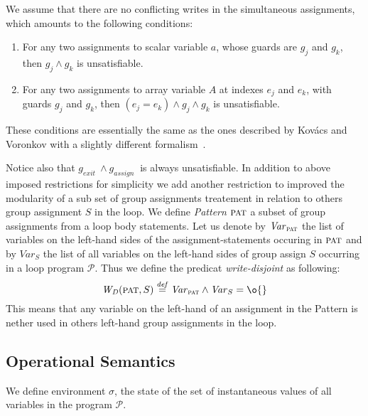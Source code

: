 \documentclass[a4paper,10pt]{article}
\newcommand{\prog}{\ensuremath{\mathcal{P}}\xspace}
\newcommand{\gexit}{\ensuremath{\mathit{g_{exit}~}}}
\newcommand{\gassign}{\ensuremath{\mathit{g_{assign}~}}}
\newcommand{\pat}{\ensuremath{\textsc{pat}}\xspace}
\newcommand{\writedisjoint}[2]{\ensuremath{\mathit{W_D}(#1,#2)}\xspace}
\newcommand{\var}[1]{\ensuremath{\mathit{Var}_{#1}}\xspace}
\newcommand{\symdef}{\ensuremath{\overset{\mathit{def}}{=}}}
\begin{document}
\vspace{0.5cm}

We assume that there are no conflicting writes in the simultaneous assignments,
which amounts to the following conditions:
\begin{enumerate}
\item For any two assignments to scalar variable $a$, whose guards are $g_j$
  and $g_k$, then $g_j \land g_k$ is unsatisfiable.
\item For any two assignments to array variable $A$ at indexes $e_j$ and $e_k$,
  with guards $g_j$ and $g_k$, then $(e_j = e_k) \land g_j \land g_k$ is
  unsatisfiable.
\end{enumerate}

These conditions are essentially the same as the ones described by Kov\'acs and
Voronkov with a slightly different formalism~\cite{kovacs:2009:fli}.

\vspace{0.5cm}

Notice also that $\gexit \land \gassign $ is always unsatisfiable.
In addition to above imposed restrictions for simplicity we add  another restriction
to improved the modularity of a sub set of group assignments treatement in relation 
to others group assignment $S$ in the loop. We define \emph{Pattern} \pat a subset of 
group assignments from a loop body statements.
Let us denote by \var{\pat} the list of variables on the left-hand sides of the 
assignment-statements occuring in \pat and by \var{S} the list of all variables on 
the left-hand sides of group assign $S$ occurring in a loop program \prog. 
Thus we define the predicat  \emph{write-disjoint} as following: 
$$\writedisjoint{\pat}{S} \symdef \var{\pat} \land \var{S} = \o{}$$
This means that any variable on the left-hand of an assignment in the Pattern is 
nether used in others left-hand group assignments in the loop.

\subsection*{Operational Semantics}
\newcommand{\env}{\ensuremath{\sigma}\xspace}
\newcommand{\eval}[2]{<#1, #2>}
We define environment \env, the state of the set of instantaneous values ​​of
all variables in the program \prog. 
\end{document}

